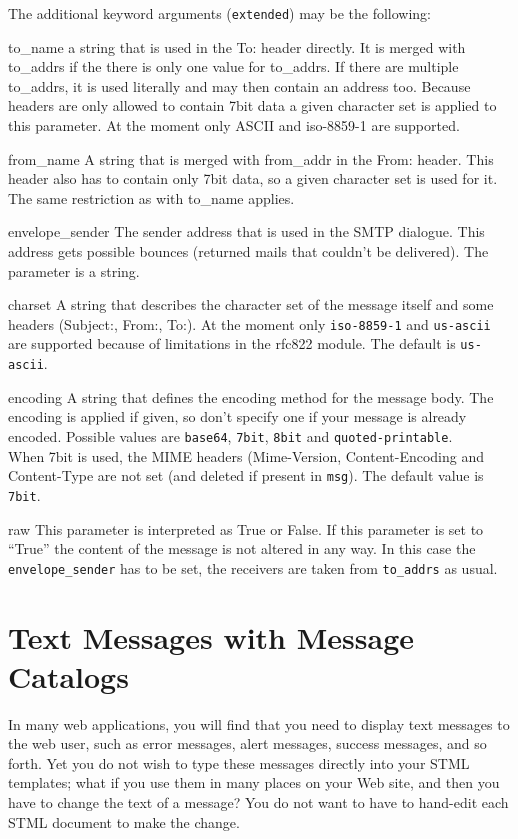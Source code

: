\documentclass{manual}
\begin{document}
The additional keyword arguments (\texttt{extended}) may be the following:
\begin{argdesc}
  \item[to\_name] a string that is used in the To: header directly.
    It is merged with to\_addrs if the there is only one value for
    to\_addrs. If there are multiple to_addrs, it is used
    literally and may then contain an address too. Because headers
    are only allowed to contain 7bit data a given character set
    is applied to this parameter. At the moment only
    ASCII and iso-8859-1 are supported.
  \item[from\_name] A string that is merged with from_addr in the
    From: header. This header also has to contain only 7bit data,
    so a given character set is used for it. The same restriction as
    with to\_name applies.
  \item[envelope\_sender] The sender address that is used in the
    SMTP dialogue. This address gets possible bounces (returned
    mails that couldn't be delivered). The parameter is a string.
  \item[charset] A string that describes the character set
    of the message itself and some headers (Subject:, From:, To:).
    At the moment only \texttt{iso-8859-1} and \texttt{us-ascii}
    are supported because of limitations in the rfc822 module.
    The default is \texttt{us-ascii}.
  \item[encoding] A string that defines the encoding method for
    the message body. The encoding is applied if given, so don't
    specify one if your message is already encoded. Possible values
    are \texttt{base64}, \texttt{7bit}, \texttt{8bit} and
    \texttt{quoted-printable}.\\
    When 7bit is used, the MIME headers (Mime-Version,
    Content-Encoding and Content-Type are not set (and deleted
    if present in \texttt{msg}). The default value is \texttt{7bit}.
  \item[raw] This parameter is interpreted as True or False.
    If this parameter is set to ``True'' the content of the message
    is not altered in any way. In this case the \texttt{envelope\_sender}
    has to be set, the receivers are taken from \texttt{to_addrs} as
    usual.
\end{argdesc}

\chapter{Text Messages with Message Catalogs}
\label{stmlrefmsg}
In many web applications, you will find that you need
to display text messages to the web user, such as 
error messages, alert messages, success messages,
and so forth. Yet you do not wish to type these messages
directly into your STML templates; what if you use them
in many places on your Web site, and then you have to
change the text of a message? You do not want to have
to hand-edit each STML document to make the change.
\end{document}
